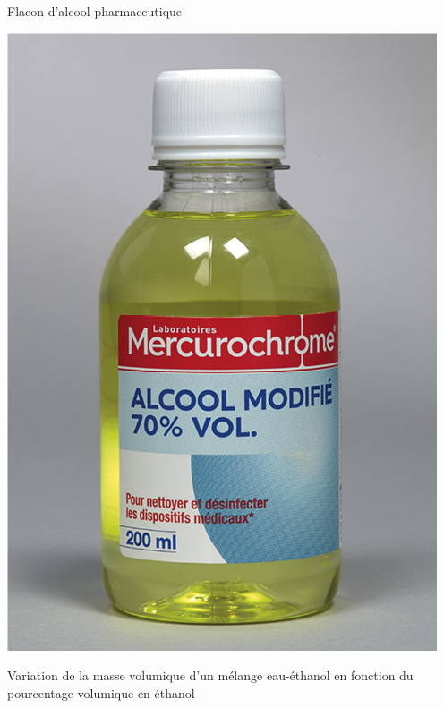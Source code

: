 \begin{multicols}{2}
    \begin{doc}{Flacon d'alcool pharmaceutique}
\begin{center}
    \includegraphics[scale=0.81]{Images/Alcool_pharma.png}
\end{center}
\end{doc}
\begin{doc}{Variation de la masse volumique d’un mélange eau-éthanol en fonction du pourcentage volumique en éthanol}
\vspace{-1cm}
\begin{center}

\end{center}
\end{doc}
\end{multicols}

